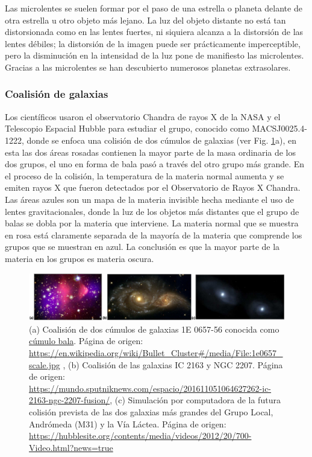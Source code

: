 Las microlentes se suelen formar por el paso de una estrella o planeta delante de otra estrella u otro objeto más lejano. La luz del objeto distante no está tan distorsionada como en las lentes fuertes, ni siquiera alcanza a la distorsión de las lentes débiles; la distorsión de la imagen puede ser prácticamente imperceptible, pero la disminución en la intensidad de la luz pone de manifiesto las microlentes. Gracias a las microlentes se han descubierto numerosos planetas extrasolares.

\subsubsection{Coalisión de galaxias}

Los científicos usaron el observatorio Chandra de rayos X de la NASA y el Telescopio Espacial Hubble para estudiar el grupo, conocido como MACSJ0025.4-1222, donde se enfoca una colisión de dos cúmulos de galaxias (ver Fig. \ref{coalision}a), en esta las dos áreas rosadas contienen la mayor parte de la masa ordinaria de los dos grupos, el uno en forma de bala pasó a través del otro grupo más grande. En el proceso de la colisión, la temperatura de la materia normal aumenta y se emiten rayos X que fueron detectados por el Observatorio de Rayos X Chandra. Las áreas azules son un mapa de la materia invisible hecha mediante el uso de lentes gravitacionales, donde la luz de los objetos más distantes que el grupo de balas se dobla por la materia que interviene. La materia normal que se muestra en rosa está claramente separada de la mayoría de la materia que comprende los grupos que se muestran en azul. La conclusión es que la mayor parte de la materia en los grupos es materia oscura.
\cite{marsh_strings_2019}
\begin{figure}[h]
\centering
\includegraphics[width=1\textwidth]{Fisica_de_Particulas/imagenes/fritz2.png}
\caption{(a) Coalisión de dos cúmulos de galaxias 1E 0657-56 conocida como \href{https://en.wikipedia.org/wiki/Bullet_Cluster}{cúmulo bala}. Página de origen: \url{https://en.wikipedia.org/wiki/Bullet_Cluster\#/media/File:1e0657_scale.jpg} , (b) Coalisión de las galaxias IC 2163 y NGC 2207. Página de origen: \url{https://mundo.sputniknews.com/espacio/201611051064627262-ic-2163-ngc-2207-fusion/}, (c) Simulación por computadora de la futura colisión prevista de las dos galaxias más grandes del Grupo Local, Andrómeda (M31) y la Vía Láctea. Página de origen: \url{https://hubblesite.org/contents/media/videos/2012/20/700-Video.html?news=true} }
\label{coalision}
\end{figure}
